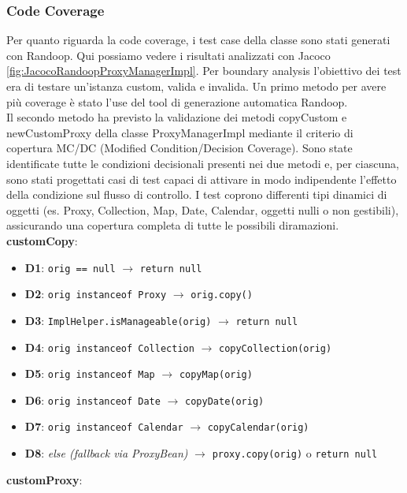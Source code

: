 \documentclass[10pt]{article}
\begin{document}
{		\subsubsection{Code Coverage}
		Per quanto riguarda la code coverage, i test case della classe sono stati generati con Randoop. Qui possiamo vedere i risultati analizzati con Jacoco \autoref{fig:JacocoRandoopProxyManagerImpl}.
		Per boundary analysis l'obiettivo dei test era di testare un'istanza custom, valida e invalida. Un primo metodo per avere più coverage è stato l'use del tool di generazione automatica Randoop.\\
		Il secondo metodo ha previsto la validazione dei metodi copyCustom e newCustomProxy della classe ProxyManagerImpl mediante il criterio di copertura MC/DC (Modified Condition/Decision Coverage). Sono state identificate tutte le condizioni decisionali presenti nei due metodi e, per ciascuna, sono stati progettati casi di test capaci di attivare in modo indipendente l’effetto della condizione sul flusso di controllo. I test coprono differenti tipi dinamici di oggetti (es. Proxy, Collection, Map, Date, Calendar, oggetti nulli o non gestibili), assicurando una copertura completa di tutte le possibili diramazioni.
		\newpage
		\textbf{customCopy}:
		\begin{itemize}[label=--, itemsep=2pt, parsep=0pt]
			\item \textbf{D1}: \texttt{orig == null}  $\rightarrow$ \texttt{return null}
			\item \textbf{D2}: \texttt{orig instanceof Proxy}  $\rightarrow$ \texttt{orig.copy()}
			\item \textbf{D3}: \texttt{ImplHelper.isManageable(orig)} $\rightarrow$ \texttt{return null}
			\item \textbf{D4}: \texttt{orig instanceof Collection}  $\rightarrow$ \texttt{copyCollection(orig)}
			\item \textbf{D5}: \texttt{orig instanceof Map}  $\rightarrow$ \texttt{copyMap(orig)}
			\item \textbf{D6}: \texttt{orig instanceof Date}  $\rightarrow$ \texttt{copyDate(orig)}
			\item \textbf{D7}: \texttt{orig instanceof Calendar}  $\rightarrow$ \texttt{copyCalendar(orig)}
			\item \textbf{D8}: \textit{else (fallback via ProxyBean)}  $\rightarrow$ \texttt{proxy.copy(orig)} o \texttt{return null}
		\end{itemize}
		\textbf{customProxy}:
		\begin{itemize}[label=--, itemsep=2pt, parsep=0pt]

\end{itemize}}
\end{document}
